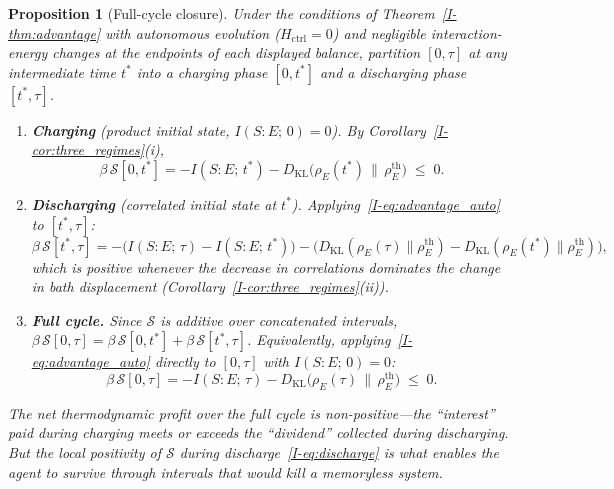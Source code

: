 \documentclass[12pt,a4paper,openany]{book}
\newtheorem{proposition}[theorem]{Proposition}
\begin{document}
\begin{proposition}[Full-cycle closure]
\label{I-prop:full_cycle}
Under the conditions of
Theorem~\textup{\ref{I-thm:advantage}} with autonomous evolution
($H_{\mathrm{ctrl}} = 0$) and negligible interaction-energy changes
at the endpoints of each displayed balance, partition $[0,\tau]$ at any
intermediate time $t^*$ into a charging phase $[0,t^*]$ and
a discharging phase $[t^*,\tau]$.
\begin{enumerate}
\item[\textup{(i)}]
  \textbf{Charging} (product initial state, $I(S{:}E;\,0) = 0$).
  By Corollary~\textup{\ref{I-cor:three_regimes}(i)},
  \begin{equation}
  \label{I-eq:charge}
  \beta\,\mathcal{S}[0,t^*]
  = -I(S{:}E;\,t^*)
    - D_{\mathrm{KL}}\!\bigl(\rho_E(t^*) \,\big\|\,
      \rho_E^{\mathrm{th}}\bigr)
  \;\leq\; 0.
  \end{equation}
\item[\textup{(ii)}]
  \textbf{Discharging} (correlated initial state at $t^*$).
  Applying~\eqref{I-eq:advantage_auto} to $[t^*,\tau]$:
  \begin{equation}
  \label{I-eq:discharge}
  \beta\,\mathcal{S}[t^*,\tau]
  = -\bigl(I(S{:}E;\,\tau) - I(S{:}E;\,t^*)\bigr)
    - \bigl(D_{\mathrm{KL}}(\rho_E(\tau)\|\rho_E^{\mathrm{th}})
      - D_{\mathrm{KL}}(\rho_E(t^*)\|\rho_E^{\mathrm{th}})\bigr),
  \end{equation}
  which is positive whenever the decrease in correlations
  dominates the change in bath displacement
  (Corollary~\textup{\ref{I-cor:three_regimes}(ii)}).
\item[\textup{(iii)}]
  \textbf{Full cycle.}
  Since $\mathcal{S}$ is additive over concatenated intervals,
  $\beta\,\mathcal{S}[0,\tau]
  = \beta\,\mathcal{S}[0,t^*]
    + \beta\,\mathcal{S}[t^*,\tau]$.
  Equivalently, applying~\eqref{I-eq:advantage_auto} directly to
  $[0,\tau]$ with $I(S{:}E;\,0) = 0$:
  \begin{equation}
  \label{I-eq:full_cycle}
  \beta\,\mathcal{S}[0,\tau]
  = -I(S{:}E;\,\tau)
    - D_{\mathrm{KL}}\!\bigl(\rho_E(\tau) \,\big\|\,
      \rho_E^{\mathrm{th}}\bigr)
  \;\leq\; 0.
  \end{equation}
\end{enumerate}
The net thermodynamic profit over the full cycle is
non-positive---the ``interest'' paid during charging
meets or exceeds the ``dividend'' collected during
discharging.
But the \emph{local} positivity of $\mathcal{S}$ during
discharge~\eqref{I-eq:discharge} is what enables the agent
to survive through intervals that would kill a memoryless
system.
\end{proposition}
\end{document}
